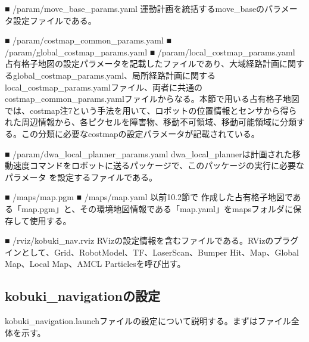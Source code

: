 ■ /param/move\_base\_params.yaml
運動計画を統括するmove\_baseのパラメータ設定ファイルである。

■ /param/costmap\_common\_params.yaml
■ /param/global\_costmap\_params.yaml
■ /param/local\_costmap\_params.yaml
占有格子地図の設定パラメータを記載したファイルであり、大域経路計画に関するglobal\_costmap\_params.yaml、局所経路計画に関するlocal\_costmap\_params.yamlファイル、両者に共通のcostmap\_common\_params.yamlファイルからなる。本節で用いる占有格子地図では、costmap注7という手法を用いて、ロボットの位置情報とセンサから得られた周辺情報から、各ピクセルを障害物、移動不可領域、移動可能領域に分類する。この分類に必要なcostmapの設定パラメータが記載されている。

■ /param/dwa\_local\_planner\_params.yaml
dwa\_local\_plannerは計画された移動速度コマンドをロボットに送るパッケージで、このパッケージの実行に必要なパラメータ  を設定するファイルである。

■ /maps/map.pgm
■ /maps/map.yaml
以前10.2節で  作成した占有格子地図である「map.pgm」と、その環境地図情報である「map.yaml」をmapsフォルダに保存して使用する。

■ /rviz/kobuki\_nav.rviz
RVizの設定情報を含むファイルである。RVizのプラグインとして、Grid、RobotModel、TF、LaserScan、Bumper Hit、Map、Global Map、Local Map、AMCL Particlesを呼び出す。

\subsection{kobuki\_navigationの設定}

kobuki\_navigation.launchファイルの設定について説明する。まずはファイル全体を示す。

